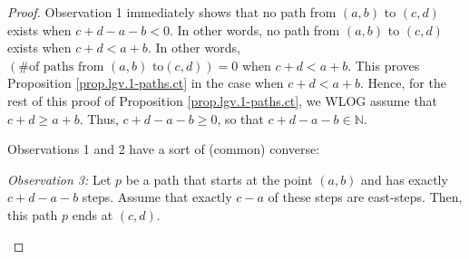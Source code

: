 \begin{definition}
\begin{proof}
Observation 1 immediately shows that no path from $\left(  a,b\right)  $ to
$\left(  c,d\right)  $ exists when $c+d-a-b<0$. In other words, no path from
$\left(  a,b\right)  $ to $\left(  c,d\right)  $ exists when $c+d<a+b$. In
other words, $\left(  \text{\# of paths from }\left(  a,b\right)  \text{ to
}\left(  c,d\right)  \right)  =0$ when $c+d<a+b$. This proves Proposition
\ref{prop.lgv.1-paths.ct} in the case when $c+d<a+b$. Hence, for the rest of
this proof of Proposition \ref{prop.lgv.1-paths.ct}, we WLOG assume that
$c+d\geq a+b$. Thus, $c+d-a-b\geq0$, so that $c+d-a-b\in\mathbb{N}$.

Observations 1 and 2 have a sort of (common) converse:

\begin{statement}
\textit{Observation 3:} Let $p$ be a path that starts at the point $\left(
a,b\right)  $ and has exactly $c+d-a-b$ steps. Assume that exactly $c-a$ of
these steps are east-steps. Then, this path $p$ ends at $\left(  c,d\right)  $.
\end{statement}

\begin{fineprint}
[\textit{Proof of Observation 3:} Let $\left(  c^{\prime},d^{\prime}\right)  $
be the point at which this path $p$ ends. Then, we can apply Observation 1 to
$\left(  c^{\prime},d^{\prime}\right)  $ instead of $\left(  c,d\right)  $,
and hence conclude that this path has exactly $c^{\prime}+d^{\prime}-a-b$
steps. Since we already know that this path has exactly $c+d-a-b$ steps, we
therefore conclude that $c^{\prime}+d^{\prime}-a-b=c+d-a-b$. In other words,
$c^{\prime}+d^{\prime}=c+d$. Similarly, using Observation 2, we can find that
$c^{\prime}=c$. Subtracting this equality from $c^{\prime}+d^{\prime}=c+d$, we
obtain $d^{\prime}=d$. Combining $c^{\prime}=c$ with $d^{\prime}=d$, we find
$\left(  c^{\prime},d^{\prime}\right)  =\left(  c,d\right)  $. Thus, our path
$p$ ends at $\left(  c,d\right)  $ (since we know that it ends at $\left(
c^{\prime},d^{\prime}\right)  $). This proves Observation 3.] \medskip
\end{fineprint}


\end{proof}
\end{definition}
